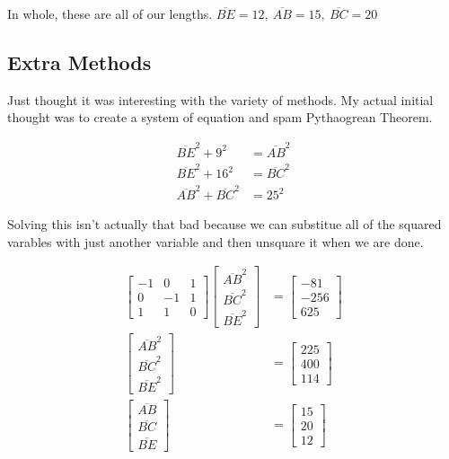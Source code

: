 \begin{solution}
In whole, these are all of our lengths. $\boxed{\overline{BE} = 12, \ \overline{AB} = 15, \ \overline{BC} = 20}$

\subsection{Extra Methods}

Just thought it was interesting with the variety of methods. My actual initial 
thought was to create a system of equation and spam Pythaogrean Theorem.

\begin{align*}
    \overline{BE}^{2}+9^{2} &= \overline{AB}^{2} \\
    \overline{BE}^{2}+16^{2} &= \overline{BC}^{2} \\
    \overline{AB}^{2}+\overline{BC}^{2} &= 25^{2}
\end{align*}

Solving this isn't actually that bad because we can substitue all of the squared 
varables with just another variable and then unsquare it when we are done.

\begin{align*}
    \begin{bmatrix}
            -1 & 0 & 1 \\
            0 & -1 & 1 \\
            1 & 1 & 0
    \end{bmatrix}
    \begin{bmatrix}
        \overline{AB}^{2} \\
        \overline{BC}^{2} \\
        \overline{BE}^{2}
    \end{bmatrix}
    &=
    \begin{bmatrix}
        -81 \\
        -256 \\
        625
    \end{bmatrix} \\
    \begin{bmatrix}
        \overline{AB}^{2} \\
        \overline{BC}^{2} \\
        \overline{BE}^{2}
    \end{bmatrix}
    &=
    \begin{bmatrix}
        225 \\
        400 \\
        114
    \end{bmatrix} \\
    \begin{bmatrix}
        \overline{AB} \\
        \overline{BC} \\
        \overline{BE}
    \end{bmatrix}
    &=
    \begin{bmatrix}
        15 \\
        20 \\
        12
    \end{bmatrix} 
\end{align*}


\end{solution}
